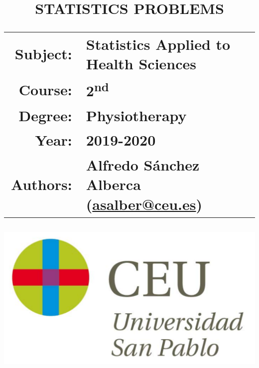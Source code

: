 \documentclass[a4paper,titlepage]{article}
\begin{document}
\sloppy

\title{\vskip 2cm
\Huge \textbf{\textsf{\quad \textcolor{blueceu}{STATISTICS PROBLEMS}\quad}}\\
\vskip 1cm
\Large \sffamily
\begin{tabular}{rl}
\textcolor{blueceu}{Subject:} & Statistics Applied to Health Sciences            \\
\textcolor{blueceu}{Course:}  & 2\textsuperscript{nd}                            \\
\textcolor{blueceu}{Degree:}  & Physiotherapy                                    \\
\textcolor{blueceu}{Year:}    & 2019-2020                                        \\
\textcolor{blueceu}{Authors:}
                              & Alfredo S\'anchez Alberca (\url{asalber@ceu.es})
\end{tabular}
}

\author{}
\date{\includegraphics[scale=0.3]{img/logo_uspceu}}

\maketitle
\newpage






% 
\end{document}

